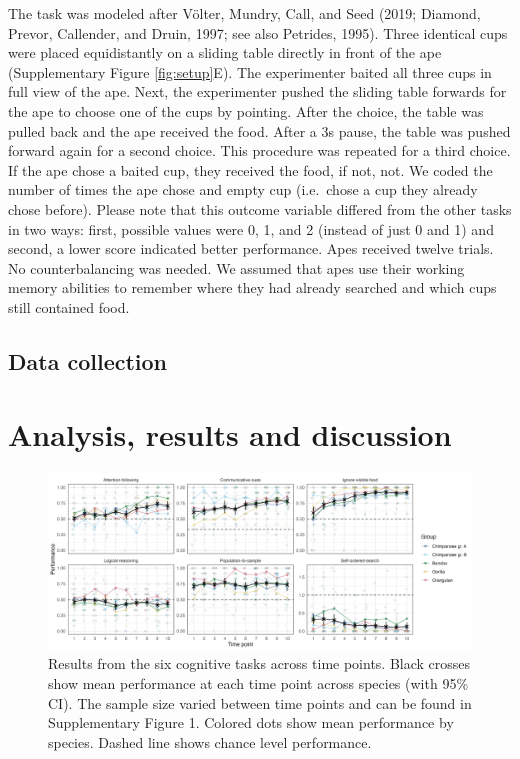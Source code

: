 \documentclass[
  man,floatsintext]{apa6}
\begin{document}
The task was modeled after Völter, Mundry, Call, and Seed (2019; Diamond, Prevor, Callender, and Druin, 1997; see also Petrides, 1995). Three identical cups were placed equidistantly on a sliding table directly in front of the ape (Supplementary Figure \ref{fig:setup}E). The experimenter baited all three cups in full view of the ape. Next, the experimenter pushed the sliding table forwards for the ape to choose one of the cups by pointing. After the choice, the table was pulled back and the ape received the food. After a 3s pause, the table was pushed forward again for a second choice. This procedure was repeated for a third choice. If the ape chose a baited cup, they received the food, if not, not. We coded the number of times the ape chose and empty cup (i.e.~chose a cup they already chose before). Please note that this outcome variable differed from the other tasks in two ways: first, possible values were 0, 1, and 2 (instead of just 0 and 1) and second, a lower score indicated better performance. Apes received twelve trials. No counterbalancing was needed. We assumed that apes use their working memory abilities to remember where they had already searched and which cups still contained food.

\hypertarget{data-collection}{%
\subsection{Data collection}\label{data-collection}}

\hypertarget{analysis-results-and-discussion}{%
\section{Analysis, results and discussion}\label{analysis-results-and-discussion}}

\begin{figure}
\includegraphics[width=1\linewidth]{../visuals/perf} \caption{Results from the six cognitive tasks across time points. Black crosses show mean performance at each time point across species (with 95\% CI). The sample size varied between time points and can be found in Supplementary Figure 1. Colored dots show mean performance by species. Dashed line shows chance level performance.}\label{fig:perfplot}
\end{figure}
\end{document}
